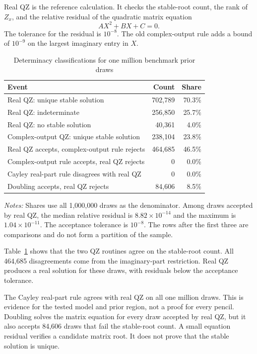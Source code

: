 \documentclass[11pt]{article}
\begin{document}
Real QZ is the reference calculation. It checks the stable-root count, the
rank of $Z_x$, and the relative residual of the quadratic matrix equation
\[
    AX^2+BX+C=0.
\]
The tolerance for the residual is $10^{-8}$. The old complex-output rule adds
a bound of $10^{-9}$ on the largest imaginary entry in $X$.

\begin{table}[H]
\centering
\caption{Determinacy classifications for one million benchmark prior draws}
\label{tab:audit}
\small
\begin{tabular}{lrr}
\toprule
Event & Count & Share \\
\midrule
Real QZ: unique stable solution & 702,789 & 70.3\% \\
Real QZ: indeterminate & 256,850 & 25.7\% \\
Real QZ: no stable solution & 40,361 & 4.0\% \\
Complex-output QZ: unique stable solution & 238,104 & 23.8\% \\
Real QZ accepts, complex-output rule rejects & 464,685 & 46.5\% \\
Complex-output rule accepts, real QZ rejects & 0 & 0.0\% \\
Cayley real-part rule disagrees with real QZ & 0 & 0.0\% \\
Doubling accepts, real QZ rejects & 84,606 & 8.5\% \\
\bottomrule
\end{tabular}

\vspace{0.4em}
\begin{minipage}{0.92\textwidth}
\footnotesize
\textit{Notes:} Shares use all 1,000,000 draws as the denominator. Among draws
accepted by real QZ, the median relative residual is
$8.82\times10^{-14}$ and the maximum is $1.04\times10^{-11}$. The acceptance
tolerance is $10^{-8}$. The rows after the first three are comparisons and do
not form a partition of the sample.
\end{minipage}
\end{table}

Table~\ref{tab:audit} shows that the two QZ routines agree on the stable-root
count. All 464,685 disagreements come from the imaginary-part restriction.
Real QZ produces a real solution for these draws, with residuals below the
acceptance tolerance.

The Cayley real-part rule agrees with real QZ on all one million draws. This is
evidence for the tested model and prior region, not a proof for every pencil.
Doubling solves the matrix equation for every draw accepted by real QZ, but it
also accepts 84,606 draws that fail the stable-root count. A small equation
residual verifies a candidate matrix root. It does not prove that the stable
solution is unique.
\end{document}
